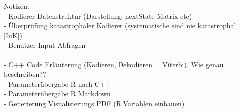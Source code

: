 Notizen:\\
- Kodierer Datenstruktur (Darstellung: nextState Matrix etc)\\
- Überprüfung katastrophaler Kodierer (systematische sind nie katastrophal [IuK])\\
- Benutzer Input Abfragen\\
\\
- C++ Code Erläuterung (Kodieren, Dekodieren = Viterbi). Wie genau beschreiben??\\
- Parameterübergabe R nach C++\\
- Parameterübergabe R Markdown\\
- Generierung Visualisierungs PDF (R Variablen einbauen)\\